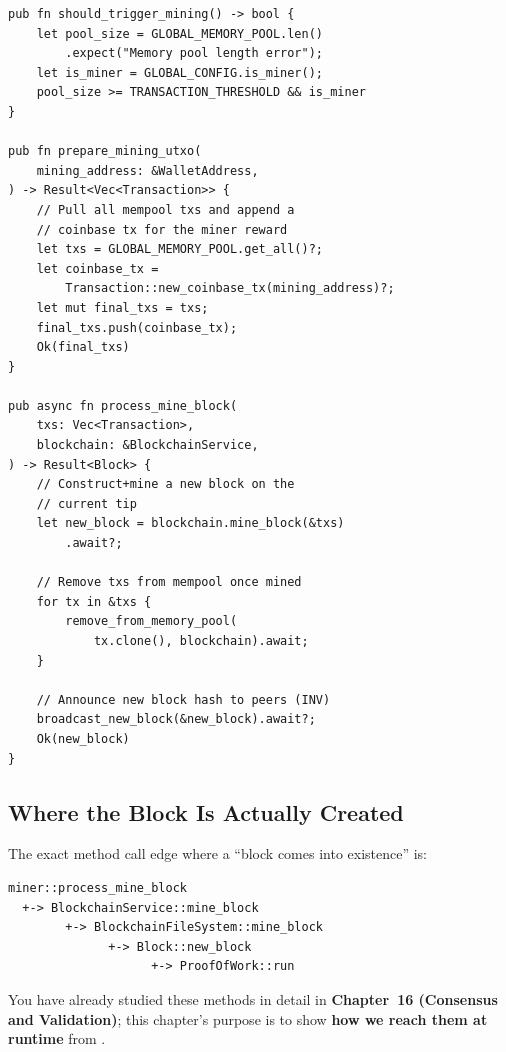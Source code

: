 \begin{listing}[htbp]
\caption{Mining trigger and block assembly ()}
\label{lst:9-9-15}
\begin{verbatim}
pub fn should_trigger_mining() -> bool {
    let pool_size = GLOBAL_MEMORY_POOL.len()
        .expect("Memory pool length error");
    let is_miner = GLOBAL_CONFIG.is_miner();
    pool_size >= TRANSACTION_THRESHOLD && is_miner
}

pub fn prepare_mining_utxo(
    mining_address: &WalletAddress,
) -> Result<Vec<Transaction>> {
    // Pull all mempool txs and append a
    // coinbase tx for the miner reward
    let txs = GLOBAL_MEMORY_POOL.get_all()?;
    let coinbase_tx =
        Transaction::new_coinbase_tx(mining_address)?;
    let mut final_txs = txs;
    final_txs.push(coinbase_tx);
    Ok(final_txs)
}

pub async fn process_mine_block(
    txs: Vec<Transaction>,
    blockchain: &BlockchainService,
) -> Result<Block> {
    // Construct+mine a new block on the
    // current tip
    let new_block = blockchain.mine_block(&txs)
        .await?;

    // Remove txs from mempool once mined
    for tx in &txs {
        remove_from_memory_pool(
            tx.clone(), blockchain).await;
    }

    // Announce new block hash to peers (INV)
    broadcast_new_block(&new_block).await?;
    Ok(new_block)
}
\end{verbatim}
\end{listing}

\subsection{Where the Block Is Actually Created}
\label{sec:ch09-9-where-created}

The exact method call edge where a ``block comes into existence'' is:

\begin{verbatim}
miner::process_mine_block
  +-> BlockchainService::mine_block
        +-> BlockchainFileSystem::mine_block
              +-> Block::new_block
                    +-> ProofOfWork::run
\end{verbatim}

You have already studied these methods in detail in \textbf{Chapter~16 (Consensus and Validation)}; this chapter's purpose is to show \textbf{how we reach them at runtime} from .

